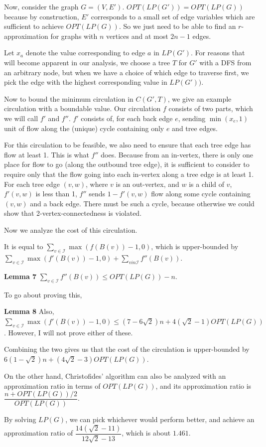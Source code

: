 \documentclass[12pt]{article}
\begin{document}
Now, consider the graph $G = (V, E')$.  $OPT(LP(G')) = OPT(LP(G))$ because by
construction, $E'$ corresponds to a small set of edge variables which are sufficient
to achieve $OPT(LP(G))$.  So we just need to be able to find an
$r$-approximation for graphs with $n$ vertices and at most $2n-1$ edges.

Let $x_a$ denote the value corresponding to edge $a$ in $LP(G')$.  For reasons that will
become apparent in our analysis, we choose a tree $T$ for $G'$ with a DFS from an
arbitrary node, but when we have a choice of which edge to traverse first, we
pick the edge with the highest corresponding value in $LP(G'))$.

Now to bound the minimum circulation in $C(G', T)$, we give an example
circulation with a boundable value.  Our circulation $f$ consists of two parts,
which we will call $f'$ and $f''$.  $f'$ consists of, for each back edge $e$,
sending $\min(x_e, 1)$ unit of flow along the (unique) cycle containing only $e$
and tree edges.

For this circulation to be feasible, we also need to ensure that each tree edge
has flow at least 1.  This is what $f''$ does.  Because from an in-vertex, there
is only one place for flow to go (along the outbound tree edge), it is
sufficient to consider to require only that the flow going into each in-vertex
along a tree edge is at least 1. For each tree edge $(v, w)$, where $v$ is an
out-vertex, and $w$ is a child of $v$, $f'(v,w)$ is less than 1, $f''$ sends $1
- f'(v,w)$ flow along some cycle containing $(v,w)$ and a back edge.  There must be
such a cycle, because otherwise we could show that 2-vertex-connectedness is
violated.

Now we analyze the cost of this circulation.

It is equal to 
$\sum_{v \in \mathcal{I}} \max(f(B(v))-1, 0)$, which is upper-bounded by
$\sum_{v \in \mathcal{I}} \max(f'(B(v))-1,0) + \sum_{v in \mathcal{I}}
f''(B(v))$.

{\bf Lemma 7}
$\sum_{v \in \mathcal{I}} f''(B(v)) \le OPT(LP(G)) - n$.

To go about proving this, 

{\bf Lemma 8}
Also, $\sum_{v \in \mathcal{I}} \max(f'(B(v)) - 1, 0) \le (7 - 6 \sqrt{2})n +
4(\sqrt{2} - 1)OPT(LP(G))$.  However, I will not prove either of these.

Combining the two gives us that the cost of the circulation is upper-bounded by
$6(1- \sqrt{2})n + (4\sqrt{2} - 3)OPT(LP(G))$.

On the other hand, Christofides' algorithm can also be analyzed with an
approximation ratio in terms of $OPT(LP(G))$, and its approximation ratio is
$\dfrac{n + OPT(LP(G))/2}{OPT(LP(G))}$.

By solving $LP(G)$, we can pick whichever would perform better, and achieve an
approximation ratio of $\dfrac{14(\sqrt{2} - 11)}{12\sqrt{2} - 13}$, which is
about $1.461$.



\end{document}

